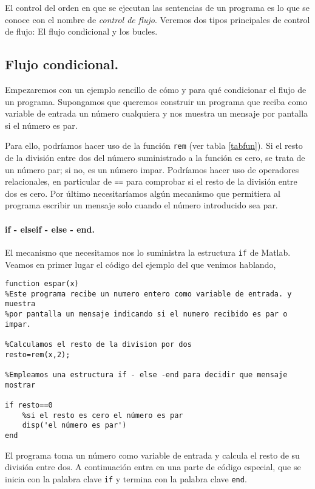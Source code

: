 El control del orden en que se ejecutan las sentencias de un programa es lo que se conoce con el nombre de \emph{control de flujo}. Veremos dos tipos principales de control de flujo: El flujo condicional y los bucles.
\subsection{Flujo condicional.}
Empezaremos con un ejemplo sencillo de cómo y para qué condicionar el flujo de un programa. Supongamos que queremos construir un programa que reciba como variable de entrada un número cualquiera y nos muestra un mensaje por pantalla si el número es par.

Para ello, podríamos hacer uso de la función \texttt{rem} (ver tabla \ref{tabfun}). Si el resto de la división entre dos del número suministrado a la función es cero, se trata de un número par; si no, es un número impar. Podríamos hacer uso de operadores relacionales, en particular de \texttt{==} para comprobar si el resto de la división entre dos es cero. Por último necesitaríamos algún mecanismo que permitiera al programa escribir un mensaje solo cuando el número introducido sea par.

\paragraph{if - elseif - else - end.} El mecanismo que necesitamos nos lo suministra la estructura \texttt{if} de Matlab. Veamos en primer lugar el código del ejemplo del que venimos hablando,

\begin{verbatim}
function espar(x)
%Este programa recibe un numero entero como variable de entrada. y muestra
%por pantalla un mensaje indicando si el numero recibido es par o impar.

%Calculamos el resto de la division por dos
resto=rem(x,2);

%Empleamos una estructura if - else -end para decidir que mensaje mostrar

if resto==0
    %si el resto es cero el número es par
    disp('el número es par')
end
\end{verbatim}

El programa toma un número como variable de entrada y calcula el resto de su división entre dos. A continuación entra en una parte de código especial, que se inicia con la palabra clave \texttt{if} y termina con la palabra clave \texttt{end}. 

